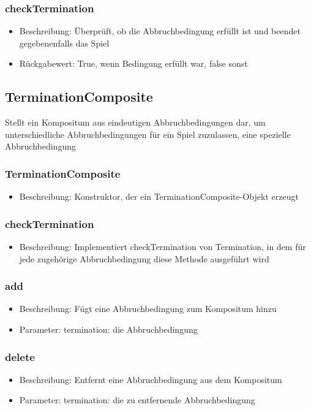 \documentclass[a4paper]{scrreprt}
\begin{document}
	\subsubsection{checkTermination}
	\begin{itemize}
		\item Beschreibung: Überprüft, ob die Abbruchbedingung erfüllt ist und beendet gegebenenfalls das Spiel
		\item Rückgabewert: True, wenn Bedingung erfüllt war, false sonst
	\end{itemize}

	\subsection{TerminationComposite}
	Stellt ein Kompositum aus eindeutigen Abbruchbedingungen dar, um unterschiedliche Abbruchbedingungen für ein Spiel zuzulassen, eine spezielle Abbruchbedingung
	\subsubsection{TerminationComposite}
	\begin{itemize}
		\item Beschreibung: Konstruktor, der ein TerminationComposite-Objekt erzeugt
	\end{itemize}
	\subsubsection{checkTermination}
	\begin{itemize}
		\item Beschreibung: Implementiert checkTermination von Termination, in dem für jede zugehörige Abbruchbedingung diese Methode ausgeführt wird
	\end{itemize}
	\subsubsection{add}
	\begin{itemize}
		\item Beschreibung: Fügt eine Abbruchbedingung zum Kompositum hinzu
		\item Parameter: termination: die Abbruchbedingung
	\end{itemize}
	\subsubsection{delete}
	\begin{itemize}
		\item Beschreibung: Entfernt eine Abbruchbedingung aus dem Kompositum
		\item Parameter: termination: die zu entfernende Abbruchbedingung
	\end{itemize}
\end{document}
